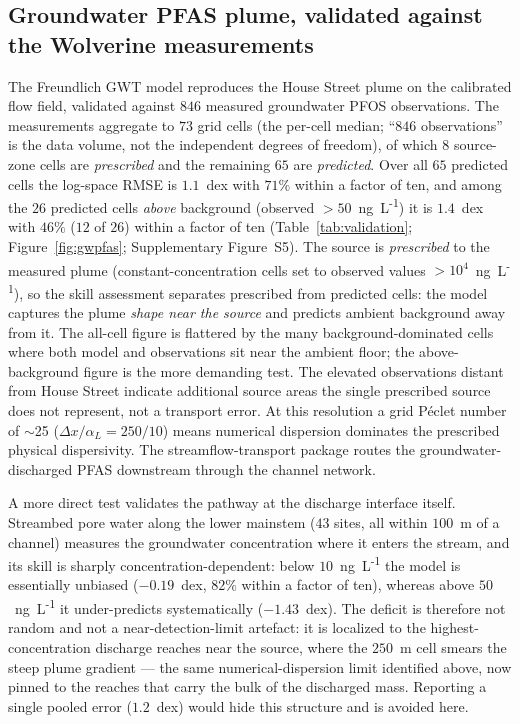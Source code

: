 \subsection{Groundwater PFAS plume, validated against the Wolverine measurements}
The Freundlich GWT model reproduces the House Street plume on the calibrated flow field, validated
against $846$ measured groundwater PFOS observations. The measurements aggregate to $73$ grid cells
(the per-cell median; ``$846$ observations'' is the data volume, not the independent degrees of
freedom), of which $8$ source-zone cells are \emph{prescribed} and the remaining $65$ are
\emph{predicted}. Over all $65$ predicted cells the log-space RMSE is $1.1$~dex with $71\%$ within a
factor of ten, and among the $26$ predicted cells \emph{above} background (observed
$>50$~ng~L\textsuperscript{-1}) it is $1.4$~dex with $46\%$ ($12$ of $26$) within a factor of ten
(Table~\ref{tab:validation}; Figure~\ref{fig:gwpfas}; Supplementary Figure~S5). The source is
\emph{prescribed} to the measured plume (constant-concentration cells set to observed values
$>10^4$~ng~L\textsuperscript{-1}), so the skill assessment separates prescribed from predicted cells:
the model captures the plume \emph{shape near the source} and predicts ambient background away from
it. The all-cell figure is flattered by the many background-dominated cells where both model and
observations sit near the ambient floor; the above-background figure is the more demanding test. The
elevated observations distant from House Street indicate additional source areas the single
prescribed source does not represent, not a transport error. At this resolution a grid P\'eclet
number of $\sim$25 ($\Delta x/\alpha_L = 250/10$) means numerical dispersion dominates the prescribed
physical dispersivity. The streamflow-transport package routes the groundwater-discharged PFAS
downstream through the channel network.

A more direct test validates the pathway at the discharge interface itself. Streambed pore water along
the lower mainstem ($43$ sites, all within $100$~m of a channel) measures the groundwater
concentration where it enters the stream, and its skill is sharply concentration-dependent: below
$10$~ng~L\textsuperscript{-1} the model is essentially unbiased ($-0.19$~dex, $82\%$ within a factor of
ten), whereas above $50$~ng~L\textsuperscript{-1} it under-predicts systematically ($-1.43$~dex). The
deficit is therefore not random and not a near-detection-limit artefact: it is localized to the
highest-concentration discharge reaches near the source, where the $250$~m cell smears the steep plume
gradient --- the same numerical-dispersion limit identified above, now pinned to the reaches that carry
the bulk of the discharged mass. Reporting a single pooled error ($1.2$~dex) would hide this structure
and is avoided here.

